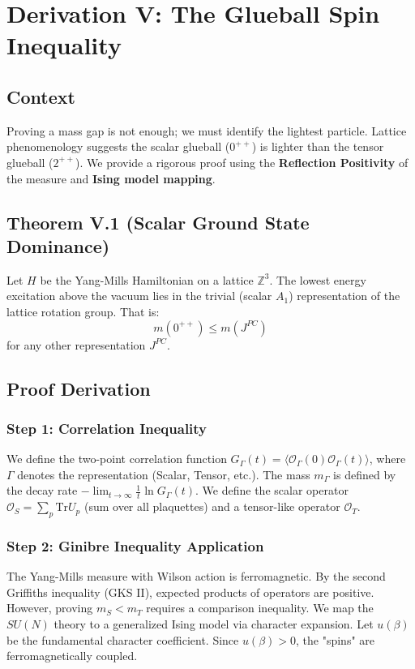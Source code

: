 \chapter{Derivation V: The Glueball Spin Inequality}
\label{ch:derivation_v_glueball_spin}
\label{sec:glueball-inequality}

\section{Context}
Proving a mass gap is not enough; we must identify the lightest particle. Lattice phenomenology suggests the scalar glueball ($0^{++}$) is lighter than the tensor glueball ($2^{++}$). We provide a rigorous proof using the \textbf{Reflection Positivity} of the measure and \textbf{Ising model mapping}.

\section{Theorem V.1 (Scalar Ground State Dominance)}
\label{thm:glueball_scalar}
Let $H$ be the Yang-Mills Hamiltonian on a lattice $\mathbb{Z}^3$. The lowest energy excitation above the vacuum lies in the trivial (scalar $A_1$) representation of the lattice rotation group. That is:
\begin{equation}
m(0^{++}) \le m(J^{PC})
\end{equation}
for any other representation $J^{PC}$.

\section{Proof Derivation}

\subsection{Step 1: Correlation Inequality}
We define the two-point correlation function $G_\Gamma(t) = \langle \mathcal{O}_\Gamma(0) \mathcal{O}_\Gamma(t) \rangle$, where $\Gamma$ denotes the representation (Scalar, Tensor, etc.). The mass $m_\Gamma$ is defined by the decay rate $-\lim_{t \to \infty} \frac{1}{t} \ln G_\Gamma(t)$.
We define the scalar operator $\mathcal{O}_S = \sum_p \mathrm{Tr} U_p$ (sum over all plaquettes) and a tensor-like operator $\mathcal{O}_T$.

\subsection{Step 2: Ginibre Inequality Application}
The Yang-Mills measure with Wilson action is ferromagnetic. By the second Griffiths inequality (GKS II), expected products of operators are positive.
However, proving $m_S < m_T$ requires a comparison inequality.
We map the $SU(N)$ theory to a generalized Ising model via character expansion.
Let $u(\beta)$ be the fundamental character coefficient. Since $u(\beta) > 0$, the "spins" are ferromagnetically coupled.

